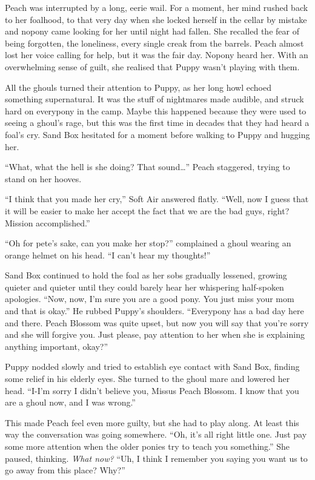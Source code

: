 Peach was interrupted by a long, eerie wail. For a moment, her mind rushed back to her foalhood, to that very day when she locked herself in the cellar by mistake and nopony came looking for her until night had fallen. She recalled the fear of being forgotten, the loneliness, every single creak from the barrels. Peach almost lost her voice calling for help, but it was the fair day. Nopony heard her. With an overwhelming sense of guilt, she realised that Puppy wasn't playing with them.

All the ghouls turned their attention to Puppy, as her long howl echoed something supernatural. It was the stuff of nightmares made audible, and struck hard on everypony in the camp. Maybe this happened because they were used to seeing a ghoul's rage, but this was the first time in decades that they had heard a foal's cry. Sand Box hesitated for a moment before walking to Puppy and hugging her.

``What, what the hell is she doing? That sound\dots'' Peach staggered, trying to stand on her hooves.

``I think that you made her cry,'' Soft Air answered flatly. ``Well, now I guess that it will be easier to make her accept the fact that we are the bad guys, right? Mission accomplished.''

``Oh for pete's sake, can you make her stop?'' complained a ghoul wearing an orange helmet on his head. ``I can't hear my thoughts!''

Sand Box continued to hold the foal as her sobs gradually lessened, growing quieter and quieter until they could barely hear her whispering half-spoken apologies. ``Now, now, I'm sure you are a good pony. You just miss your mom and that is okay.'' He rubbed Puppy's shoulders. ``Everypony has a bad day here and there. Peach Blossom was quite upset, but now you will say that you're sorry and she will forgive you. Just please, pay attention to her when she is explaining anything important, okay?''

Puppy nodded slowly and tried to establish eye contact with Sand Box, finding some relief in his elderly eyes. She turned to the ghoul mare and lowered her head. ``I-I'm sorry I didn't believe you, Missus Peach Blossom. I know that you are a ghoul now, and I was wrong.''

This made Peach feel even more guilty, but she had to play along. At least this way the conversation was going somewhere. ``Oh, it's all right little one. Just pay some more attention when the older ponies try to teach you something.'' She paused, thinking. \emph{What now?}\/ ``Uh, I think I remember you saying you want us to go away from this place? Why?''

